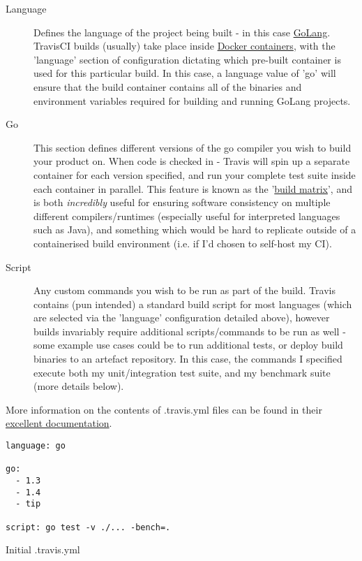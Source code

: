 \begin{description}
  \item[Language] Defines the language of the project being built - in this case
  \href{https://golang.org/}{GoLang}. TravisCI builds (usually) take place
  inside \href{https://www.docker.com/what-docker}{Docker containers}, with the
  'language' section of configuration dictating which pre-built container is used for
  this particular build. In this case, a language value of 'go' will ensure that the
  build container contains all of the binaries and environment variables required
  for building and running GoLang projects.
  \item[Go] This section defines different versions of the go compiler you wish
  to build your product on. When code is checked in - Travis will spin up a
  separate container for each version specified, and run your complete test suite
  inside each container in parallel. This feature is known as the
  '\href{https://docs.travis-ci.com/user/customizing-the-build/#Build-Matrix}{build matrix}',
  and is both \emph{incredibly} useful for ensuring software consistency on multiple
  different compilers/runtimes (especially useful for interpreted languages such
  as Java), and something which would be hard to replicate outside of a
  containerised build environment (i.e. if I'd chosen to self-host my CI).
  \item[Script] Any custom commands you wish to be run as part of the build.
  Travis contains (pun intended) a standard build script for most languages (which
  are selected via the 'language' configuration detailed above), however builds
  invariably require additional scripts/commands to be run as well - some example
  use cases could be to run additional tests, or deploy build binaries to an
  artefact repository. In this case, the commands I specified execute both my
  unit/integration test suite, and my benchmark suite (more details below).
\end{description}

More information on the contents of .travis.yml files can be found in their
\href{https://docs.travis-ci.com/}{excellent documentation}.

\begin{listing}
  \centering
  \begin{verbatim}
language: go

go:
  - 1.3
  - 1.4
  - tip

script: go test -v ./... -bench=.
  \end{verbatim}
  \caption{Initial .travis.yml}
  \label{lst:initialTravis}
\end{listing}

